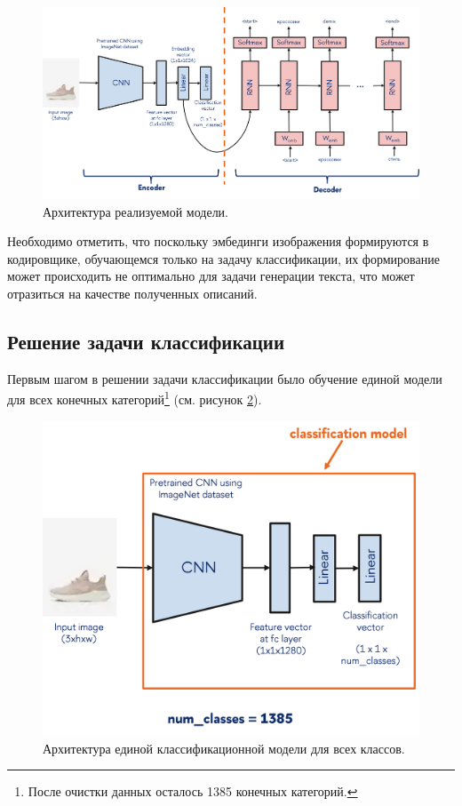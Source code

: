 \documentclass[a4paper,12pt]{extarticle}
\begin{document}
\begin{figure}[ht]
	\centering
	\includegraphics[scale=0.55]{general_scheme.png}
	\caption{Архитектура реализуемой модели.}
	\label{fig:general_scheme}
\end{figure}

Необходимо отметить, что поскольку эмбединги изображения формируются в кодировщике, обучающемся только на задачу классификации, их формирование может происходить не оптимально для задачи генерации текста, что может отразиться на качестве полученных описаний.

\subsection{Решение задачи классификации}\label{subsection:results-classification}

Первым шагом в решении задачи классификации было обучение единой модели для всех конечных категорий\footnote{После очистки данных осталось 1385 конечных категорий.} (см. рисунок \ref{fig:classification_onemodel}). 

\begin{figure}[ht]
	\centering
	\includegraphics[scale=0.7]{classification/classification_onemodel.png}
	\caption{Архитектура единой классификационной модели для всех классов.}
	\label{fig:classification_onemodel}
\end{figure}
\end{document}

